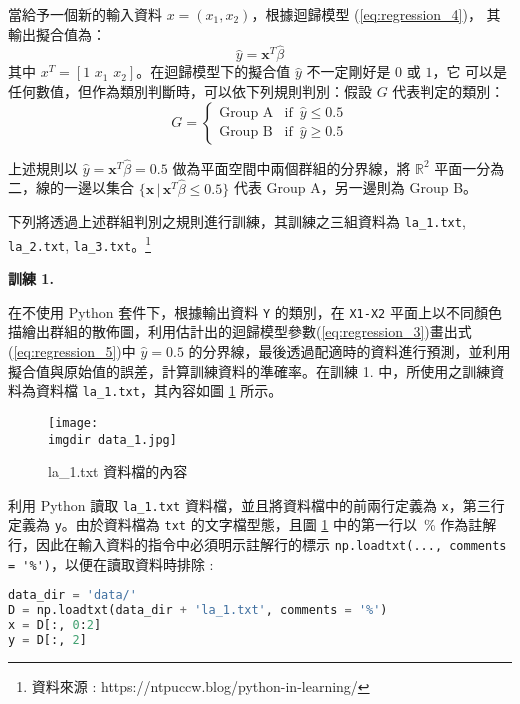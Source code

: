 \begin{tcolorbox}[title = {群組判別}]
當給予一個新的輸入資料 $x = (x_1, x_2)$，根據迴歸模型 (\ref{eq:regression_4})，
其輸出擬合值為：
\begin{equation}\label{eq:regression_5}
\hat{y} = \mathbf{x}^T \hat{\beta}
\end{equation}
其中 $x^T = [1 \,\,x_1 \,\,x_2]$。在迴歸模型下的擬合值 $\hat{y}$ 不一定剛好是 $0$ 或 $1$，它
可以是任何數值，但作為類別判斷時，可以依下列規則判別：假設 $G$ 代表判定的類別：
\[G = \begin{cases} 
\text{Group A}  & \mbox{if}\,\,\,\hat{y} \leq 0.5 \\ 
\text{Group B}  & \mbox{if}\,\,\,\hat{y} \geq 0.5
\end{cases}\]
\end{tcolorbox}
上述規則以 $\hat{y} = \mathbf{x}^T \hat{\beta} = 0.5$ 做為平面空間中兩個群組的分界線，將 $\mathbb{R}^2$ 平面一分為二，線的一邊以集合 $\{\mathbf{x}\,|\,\mathbf{x}^T \hat{\beta} \leq 0.5\}$ 代表 Group A，另一邊則為 Group B。

\newpage
下列將透過上述群組判別之規則進行訓練，其訓練之三組資料為 \verb|la_1.txt|, \verb|la_2.txt|, \verb|la_3.txt|。\footnote{資料來源 : https://ntpuccw.blog/python-in-learning/}

\textbf{\large 訓練 1.} 

在不使用 Python 套件下，根據輸出資料 \verb|Y| 的類別，在 \verb|X1-X2| 平面上以不同顏色描繪出群組的散佈圖，利用估計出的迴歸模型參數(\ref{eq:regression_3})畫出式(\ref{eq:regression_5})中 $\hat{y} = 0.5$ 的分界線，最後透過配適時的資料進行預測，並利用擬合值與原始值的誤差，計算訓練資料的準確率。在訓練 1. 中，所使用之訓練資料為資料檔 \verb|la_1.txt|，其內容如圖 \ref{fig:data_1} 所示。

\begin{figure}[H]
    \centering
        \texttt{[image: \\imgdir data\_1.jpg]}
    \caption{la\_1.txt 資料檔的內容}
    \label{fig:data_1}
\end{figure}

利用 Python 讀取 \verb|la_1.txt| 資料檔，並且將資料檔中的前兩行定義為 \verb|x|，第三行定義為 \verb|y|。由於資料檔為 \verb|txt| 的文字檔型態，且圖 \ref{fig:data_1} 中的第一行以 \,\% 作為註解行，因此在輸入資料的指令中必須明示註解行的標示 \verb|np.loadtxt(..., comments = '%')|，以便在讀取資料時排除 :
\bigskip
\begin{lstlisting}[language = Python]
data_dir = 'data/'
D = np.loadtxt(data_dir + 'la_1.txt', comments = '%')
x = D[:, 0:2]
y = D[:, 2]
\end{lstlisting}

